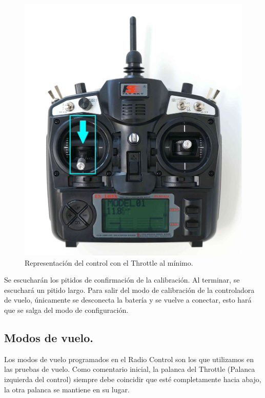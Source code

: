 \begin{figure}[h]
	\centering
	\includegraphics[width=0.5\linewidth]{imagenes/ctr2}
	\caption{Representación del control con el Throttle al mínimo.}
	\label{fig:ctr2}
\end{figure}

Se escucharán los pitidos de confirmación de la calibración. Al terminar, se escuchará un pitido largo.
Para salir del modo de calibración de la controladora de vuelo, únicamente se desconecta la batería y se vuelve a conectar, esto hará que se salga del modo de configuración.

\subsection{Modos de vuelo.}

Los modos de vuelo programados en el Radio Control son los que utilizamos en las pruebas de vuelo. Como comentario inicial, la palanca del Throttle (Palanca izquierda del control)  siempre debe coincidir que esté completamente hacia abajo, la otra palanca se mantiene en su lugar.


